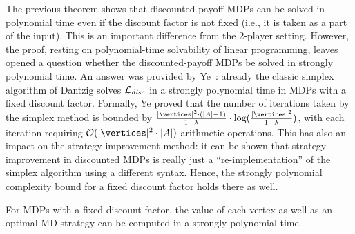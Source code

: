 The previous theorem shows that discounted-payoff MDPs can be solved in 
polynomial time even if the discount factor is not fixed (i.e., it is taken as 
a part of the input). This is an important difference from the 2-player 
setting. However, the proof, resting on polynomial-time solvability of linear 
programming, leaves opened a question whether the discounted-payoff 
MDPs be solved in strongly polynomial time.  An answer was provided by Ye~\cite{Ye:2011}: already the classic simplex 
algorithm of Dantzig solves $\mathcal{L}_{\mathit{disc}}$ in a strongly 
polynomial time in MDPs with a fixed discount factor. Formally, Ye proved that 
the number of iterations taken by the simplex method is bounded by 
$\frac{|\vertices|^2\cdot (|\actions|-1)}{1-\lambda}\cdot 
\log(\frac{|\vertices|^2}{1-\lambda})$, with each iteration requiring  
$\mathcal{O}(|\vertices|^2\cdot |\actions|)$ arithmetic operations. This has 
also an impact on the strategy improvement method: it can be shown that strategy 
improvement in discounted MDPs is really just a ``re-implementation'' of the 
simplex algorithm using a different syntax. Hence, the strongly polynomial 
complexity bound for a fixed discount factor holds there as well.

\begin{theorem}
For MDPs with a fixed discount factor, the value of each vertex as well as an 
optimal MD strategy can be computed in a strongly polynomial time.
\end{theorem}
